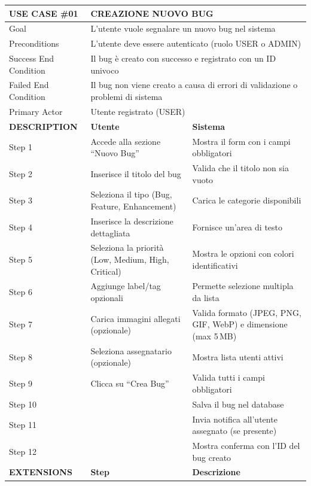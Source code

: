 \begin{longtable}{|p{3cm}|p{7cm}|p{5.5cm}|}
USE CASE \#01 & \multicolumn{2}{p{12.5cm}|}{CREAZIONE NUOVO BUG} \\
\hline
Goal & \multicolumn{2}{p{12.5cm}|}{L'utente vuole segnalare un nuovo bug nel sistema} \\
\hline
Preconditions & \multicolumn{2}{p{12.5cm}|}{L'utente deve essere autenticato (ruolo USER o ADMIN)} \\
\hline
Success End Condition & \multicolumn{2}{p{12.5cm}|}{Il bug è creato con successo e registrato con un ID univoco} \\
\hline
Failed End Condition & \multicolumn{2}{p{12.5cm}|}{Il bug non viene creato a causa di errori di validazione o problemi di sistema} \\
\hline
Primary Actor & \multicolumn{2}{p{12.5cm}|}{Utente registrato (USER)} \\
\hline\hline
\textbf{DESCRIPTION} & \textbf{Utente} & \textbf{Sistema} \\
\hline
Step 1 & Accede alla sezione ``Nuovo Bug'' & Mostra il form con i campi obbligatori \\
\hline
Step 2 & Inserisce il titolo del bug & Valida che il titolo non sia vuoto \\
\hline
Step 3 & Seleziona il tipo (Bug, Feature, Enhancement) & Carica le categorie disponibili \\
\hline
Step 4 & Inserisce la descrizione dettagliata & Fornisce un'area di testo \\
\hline
Step 5 & Seleziona la priorità (Low, Medium, High, Critical) & Mostra le opzioni con colori identificativi \\
\hline
Step 6 & Aggiunge label/tag opzionali & Permette selezione multipla da lista \\
\hline
Step 7 & Carica immagini allegati (opzionale) & Valida formato (JPEG, PNG, GIF, WebP) e dimensione (max 5\,MB) \\
\hline
Step 8 & Seleziona assegnatario (opzionale) & Mostra lista utenti attivi \\
\hline
Step 9 & Clicca su ``Crea Bug'' & Valida tutti i campi obbligatori \\
\hline
Step 10 & & Salva il bug nel database \\
\hline
Step 11 & & Invia notifica all'utente assegnato (se presente) \\
\hline
Step 12 & & Mostra conferma con l'ID del bug creato \\
\hline\hline
\textbf{EXTENSIONS} & \textbf{Step} & \textbf{Descrizione} \\
\hline

\end{longtable}
